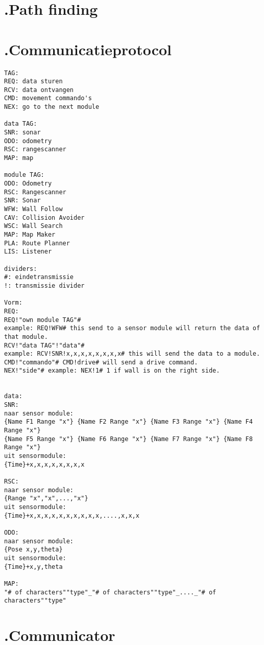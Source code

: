 \documentclass[a4paper,10pt]{article}
\begin{document}
\section*{\label{pathfinding}\thesection.\quad Path finding}

\section*{\label{protocol}\thesection.\quad Communicatieprotocol}
\begin{verbatim}
TAG:
REQ: data sturen
RCV: data ontvangen
CMD: movement commando's
NEX: go to the next module

data TAG:
SNR: sonar
ODO: odometry
RSC: rangescanner
MAP: map

module TAG:
ODO: Odometry
RSC: Rangescanner
SNR: Sonar
WFW: Wall Follow
CAV: Collision Avoider
WSC: Wall Search
MAP: Map Maker
PLA: Route Planner
LIS: Listener

dividers:
#: eindetransmissie
!: transmissie divider

Vorm:
REQ:
REQ!"own module TAG"# 
example: REQ!WFW# this send to a sensor module will return the data of that module.
RCV!"data TAG"!"data"# 
example: RCV!SNR!x,x,x,x,x,x,x,x# this will send the data to a module.
CMD!"commando"# CMD!drive# will send a drive command.
NEX!"side"# example: NEX!1# 1 if wall is on the right side.


data:
SNR:
naar sensor module:
{Name F1 Range "x"} {Name F2 Range "x"} {Name F3 Range "x"} {Name F4 Range "x"} 
{Name F5 Range "x"} {Name F6 Range "x"} {Name F7 Range "x"} {Name F8 Range "x"}
uit sensormodule:
{Time}+x,x,x,x,x,x,x,x

RSC:
naar sensor module:
{Range "x","x",...,"x"}
uit sensormodule:
{Time}+x,x,x,x,x,x,x,x,x,x,....,x,x,x

ODO:
naar sensor module:
{Pose x,y,theta}
uit sensormodule:
{Time}+x,y,theta

MAP:
"# of characters""type"_"# of characters""type"_...._"# of characters""type"
\end{verbatim}

\section*{\label{communicator}\thesection.\quad Communicator}
\end{document}
